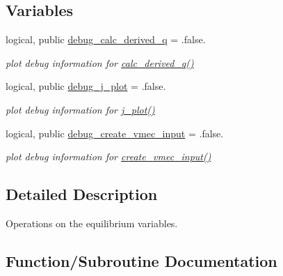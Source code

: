 \subsection*{Variables}
\begin{DoxyCompactItemize}
\item 
logical, public \hyperlink{namespaceeq__ops_a1b6609a8d8b427d9133bf323e732f209}{debug\+\_\+calc\+\_\+derived\+\_\+q} = .false.
\begin{DoxyCompactList}\small\item\em plot debug information for \hyperlink{namespaceeq__ops_a087e08ce6d8ad381b5bac8fc51148d50}{calc\+\_\+derived\+\_\+q()} \end{DoxyCompactList}\item 
logical, public \hyperlink{namespaceeq__ops_a45ba7f46fd439bbd73edfd1fd548b58e}{debug\+\_\+j\+\_\+plot} = .false.
\begin{DoxyCompactList}\small\item\em plot debug information for \hyperlink{namespaceeq__ops_afabdf28e5c26ceb87e6eb8cf3809919d}{j\+\_\+plot()} \end{DoxyCompactList}\item 
logical, public \hyperlink{namespaceeq__ops_a07ca60790a262e20bc8632be1530970a}{debug\+\_\+create\+\_\+vmec\+\_\+input} = .false.
\begin{DoxyCompactList}\small\item\em plot debug information for \hyperlink{namespaceeq__ops_a9addef683b3d4a8c587510e4c994ec61}{create\+\_\+vmec\+\_\+input()} \end{DoxyCompactList}\end{DoxyCompactItemize}


\subsection{Detailed Description}
Operations on the equilibrium variables. 

\subsection{Function/\+Subroutine Documentation}
\mbox{\label{namespaceeq__ops_a73a8c3cea1e8a636b4978bc626e0fab0}} 
